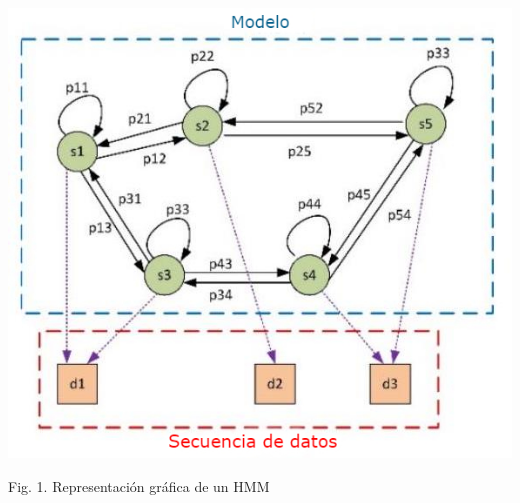 \documentclass[10pt]{article}
\begin{document}
\includegraphics[max width=\textwidth]{images/2022_09_15_69d89c46b49bb93649d1g-03}

Fig. 1. Representación gráfica de un HMM\\
\end{document}
